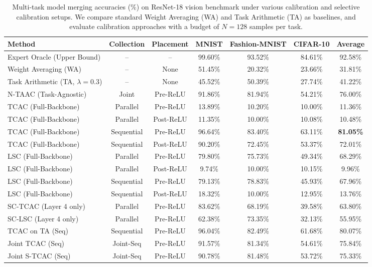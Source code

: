 \documentclass{article}
\theoremstyle{plain}
\theoremstyle{definition}
\theoremstyle{remark}
\begin{document}
\begin{table}[t]
\caption{Multi-task model merging accuracies (\%) on ResNet-18 vision benchmark under various calibration and selective calibration setups. We compare standard Weight Averaging (WA) and Task Arithmetic (TA) as baselines, and evaluate calibration approaches with a budget of $N=128$ samples per task.}
\label{tab:main_results}
\vskip 0.15in
\begin{center}
\begin{small}
\begin{sc}
\begin{tabular}{lcccccc}
\toprule
Method & Collection & Placement & MNIST & Fashion-MNIST & CIFAR-10 & Average \\
\midrule
Expert Oracle (Upper Bound) & -- & -- & 99.60\% & 93.52\% & 84.61\% & 92.58\% \\
\midrule
Weight Averaging (WA) & -- & None & 51.45\% & 20.32\% & 23.66\% & 31.81\% \\
Task Arithmetic (TA, $\lambda=0.3$) & -- & None & 45.52\% & 50.39\% & 27.74\% & 41.22\% \\
\midrule
N-TAAC (Task-Agnostic) & Joint & Pre-ReLU & 91.86\% & 81.94\% & 54.21\% & 76.00\% \\
\midrule
TCAC (Full-Backbone) & Parallel & Pre-ReLU & 13.89\% & 10.20\% & 10.00\% & 11.36\% \\
TCAC (Full-Backbone) & Parallel & Post-ReLU & 11.35\% & 10.00\% & 10.08\% & 10.48\% \\
TCAC (Full-Backbone) & Sequential & Pre-ReLU & 96.64\% & 83.40\% & 63.11\% & \textbf{81.05\%} \\
TCAC (Full-Backbone) & Sequential & Post-ReLU & 90.20\% & 72.45\% & 53.37\% & 72.01\% \\
\midrule
LSC (Full-Backbone) & Parallel & Pre-ReLU & 79.80\% & 75.73\% & 49.34\% & 68.29\% \\
LSC (Full-Backbone) & Parallel & Post-ReLU & 9.74\% & 10.00\% & 10.15\% & 9.96\% \\
LSC (Full-Backbone) & Sequential & Pre-ReLU & 79.13\% & 78.83\% & 45.93\% & 67.96\% \\
LSC (Full-Backbone) & Sequential & Post-ReLU & 18.32\% & 10.00\% & 12.95\% & 13.76\% \\
\midrule
SC-TCAC (Layer 4 only) & Parallel & Pre-ReLU & 83.62\% & 68.19\% & 39.58\% & 63.80\% \\
SC-LSC (Layer 4 only) & Parallel & Pre-ReLU & 62.38\% & 73.35\% & 32.13\% & 55.95\% \\
\midrule
TCAC on TA (Seq) & Sequential & Pre-ReLU & 96.04\% & 82.49\% & 61.68\% & 80.07\% \\
Joint TCAC (Seq) & Joint-Seq & Pre-ReLU & 91.57\% & 81.34\% & 54.61\% & 75.84\% \\
Joint S-TCAC (Seq) & Joint-Seq & Pre-ReLU & 90.78\% & 81.48\% & 53.72\% & 75.33\% \\
\bottomrule
\end{tabular}
\end{sc}
\end{small}
\end{center}
\vskip -0.1in
\end{table}
\end{document}

